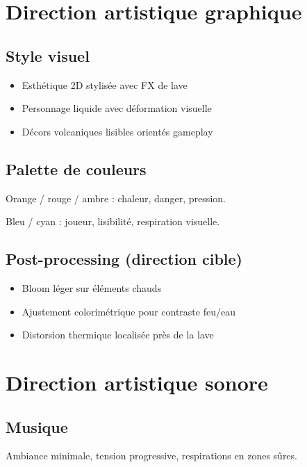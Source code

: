 ﻿\documentclass[12pt,a4paper]{article}
\begin{document}
\section{Direction artistique graphique}

\subsection{Style visuel}
\begin{itemize}[noitemsep]
    \item Esthétique 2D stylisée avec FX de lave
    \item Personnage liquide avec déformation visuelle
    \item Décors volcaniques lisibles orientés gameplay
\end{itemize}

\subsection{Palette de couleurs}
\begin{tcolorbox}[colback=fireorange!20,colframe=fireorange,title=Dominance Feu]
Orange / rouge / ambre : chaleur, danger, pression.
\end{tcolorbox}

\begin{tcolorbox}[colback=waterblue!20,colframe=waterblue,title=Présence Eau]
Bleu / cyan : joueur, lisibilité, respiration visuelle.
\end{tcolorbox}

\subsection{Post-processing (direction cible)}
\begin{itemize}[noitemsep]
    \item Bloom léger sur éléments chauds
    \item Ajustement colorimétrique pour contraste feu/eau
    \item Distorsion thermique localisée près de la lave
\end{itemize}

\section{Direction artistique sonore}

\subsection{Musique}
Ambiance minimale, tension progressive, respirations en zones sûres.
\end{document}
